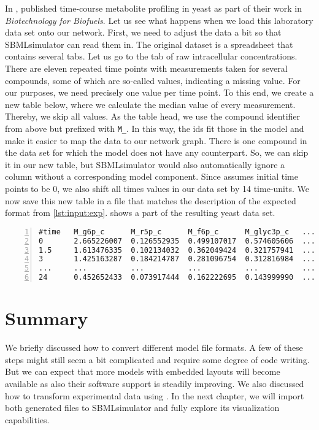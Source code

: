 In \citeyear{Bergdahl2012}, \citeauthor{Bergdahl2012} published time-course metabolite profiling in yeast as part of their work in \emph{Biotechnology for Biofuels}.
Let us see what happens when we load this laboratory data set onto our network.
First, we need to adjust the data a bit so that SBMLsimulator can read them in.
The original dataset is a \Excel spreadsheet that contains several tabs.
Let us go to the tab of raw intracellular concentrations.
There are eleven repeated time points with measurements taken for several compounds, some of which are so-called \NaN values, indicating a missing value.
For our purposes, we need precisely one value per time point.
To this end, we create a new table below, where we calculate the median value of every measurement.
Thereby, we skip all \NaN values.
As the table head, we use the compound identifier from above but prefixed with \texttt{M\_}.
In this way, the ids fit those in the \SBML model and make it easier to map the data to our network graph.
There is one compound in the data set for which the model does not have any counterpart.
So, we can skip it in our new table, but SBMLsimulator would also automatically ignore a column without a corresponding model component.
Since \SBML assumes initial time points to be 0, we also shift all times values in our data set by 14\textonehalf{} time-units.
We now save this new table in a \CSV file that matches the description of the expected format from \cref{lst:input:exp}.
 shows a part of the resulting yeast data set.
\begin{lstlisting}[caption={Part of the example yeast data set in \CSV format},label={lst:yeastexp},numbers=left,captionpos=t]
#time   M_g6p_c      M_r5p_c      M_f6p_c      M_glyc3p_c   ...
0       2.665226007  0.126552935  0.499107017  0.574605606  ...
1.5     1.613476335  0.102134032  0.362049424  0.321757941  ...
3       1.425163287  0.184214787  0.281096754  0.312816984  ...
...     ...          ...          ...          ...          ...
24      0.452652433  0.073917444  0.162222695  0.143999990  ...
\end{lstlisting}

\section{Summary}

We briefly discussed how to convert different model file formats.
A few of these steps might still seem a bit complicated and require some degree of code writing.
But we can expect that more models with embedded layouts will become available as also their software support is steadily improving.
We also discussed how to transform experimental data using \Excel.
In the next chapter, we will import both generated files to SBMLsimulator and fully explore its visualization capabilities.

